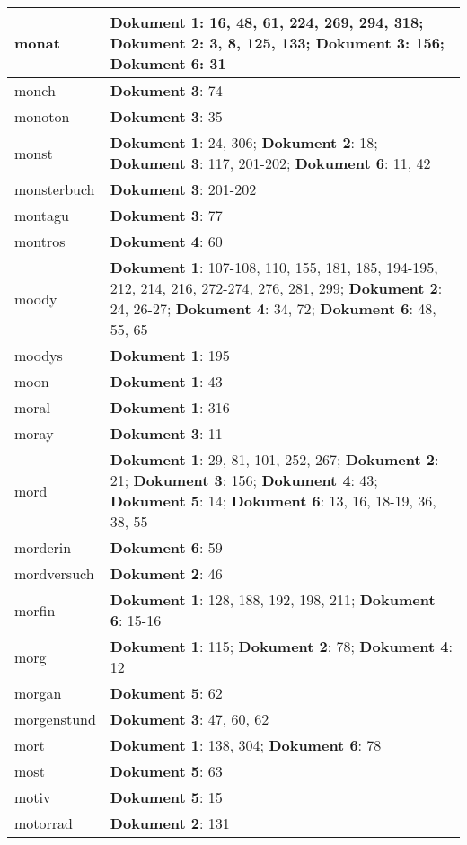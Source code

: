 \documentclass[a5paper]{article}
\begin{document}
\begin{longtable}[l]{|l|p{3in}|}
\hline
monat & \textbf{Dokument 1}: 16, 48, 61, 224, 269, 294, 318; \textbf{Dokument 2}: 3, 8, 125, 133; \textbf{Dokument 3}: 156; \textbf{Dokument 6}: 31 \\
\hline
monch & \textbf{Dokument 3}: 74 \\
\hline
monoton & \textbf{Dokument 3}: 35 \\
\hline
monst & \textbf{Dokument 1}: 24, 306; \textbf{Dokument 2}: 18; \textbf{Dokument 3}: 117, 201-202; \textbf{Dokument 6}: 11, 42 \\
\hline
monsterbuch & \textbf{Dokument 3}: 201-202 \\
\hline
montagu & \textbf{Dokument 3}: 77 \\
\hline
montros & \textbf{Dokument 4}: 60 \\
\hline
moody & \textbf{Dokument 1}: 107-108, 110, 155, 181, 185, 194-195, 212, 214, 216, 272-274, 276, 281, 299; \textbf{Dokument 2}: 24, 26-27; \textbf{Dokument 4}: 34, 72; \textbf{Dokument 6}: 48, 55, 65 \\
\hline
moodys & \textbf{Dokument 1}: 195 \\
\hline
moon & \textbf{Dokument 1}: 43 \\
\hline
moral & \textbf{Dokument 1}: 316 \\
\hline
moray & \textbf{Dokument 3}: 11 \\
\hline
mord & \textbf{Dokument 1}: 29, 81, 101, 252, 267; \textbf{Dokument 2}: 21; \textbf{Dokument 3}: 156; \textbf{Dokument 4}: 43; \textbf{Dokument 5}: 14; \textbf{Dokument 6}: 13, 16, 18-19, 36, 38, 55 \\
\hline
morderin & \textbf{Dokument 6}: 59 \\
\hline
mordversuch & \textbf{Dokument 2}: 46 \\
\hline
morfin & \textbf{Dokument 1}: 128, 188, 192, 198, 211; \textbf{Dokument 6}: 15-16 \\
\hline
morg & \textbf{Dokument 1}: 115; \textbf{Dokument 2}: 78; \textbf{Dokument 4}: 12 \\
\hline
morgan & \textbf{Dokument 5}: 62 \\
\hline
morgenstund & \textbf{Dokument 3}: 47, 60, 62 \\
\hline
mort & \textbf{Dokument 1}: 138, 304; \textbf{Dokument 6}: 78 \\
\hline
most & \textbf{Dokument 5}: 63 \\
\hline
motiv & \textbf{Dokument 5}: 15 \\
\hline
motorrad & \textbf{Dokument 2}: 131 \\

\end{longtable}
\end{document}
